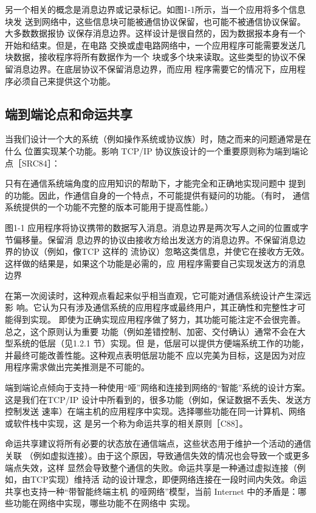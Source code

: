 另一个相关的概念是消息边界或记录标记。如图1-1所示，当一个应用将多个信息块发
送到网络中，这些信息块可能被通信协议保留，也可能不被通信协议保留。大多数数据报协
议保存消息边界。这样设计是很自然的，因为数据报本身有一个开始和结束。但是，在电路
交换或虚电路网络中，一个应用程序可能需要发送几块数据，接收程序将所有数据作为一个
块或多个块来读取。这些类型的协议不保留消息边界。在底层协议不保留消息边界，而应用
程序需要它的情况下，应用程序必须自己来提供这个功能。

\subsection{端到端论点和命运共享}
当我们设计一个大的系统（例如操作系统或协议族）时，随之而来的问题通常是在什么
位置实现某个功能。影响 TCP/IP 协议族设计的一个重要原则称为端到端论点［SRC84］：

只有在通信系统端角度的应用知识的帮助下，才能完全和正确地实现问题中
提到的功能。因此，作通信自身的一个特点，不可能提供有疑问的功能。（有时，
通信系统提供的一个功能不完整的版本可能用于提高性能。）

图1-1 应用程序将协议携带的数据写入消息。消息边界是两次写人之间的位置或字节偏移量。保留消
息边界的协议由接收方给出发送方的消息边界。不保留消息边界的协议（例如，像TCP 这样的
流协议）忽略这类信息，并使它在接收方无效。这样做的结果是，如果这个功能是必需的，应
用程序需要自己实现发送方的消息边界

在第一次阅读时，这种观点看起来似乎相当直观，它可能对通信系统设计产生深远影
响。它认为只有涉及通信系统的应用程序或最终用户，其正确性和完整性才可能得到实现。
即使为正确实现应用程序做了努力，其功能可能注定不会很完善。总之，这个原则认为重要
功能（例如差错控制、加密、交付确认）通常不会在大型系统的低层（见1.2.1 节）实现。但
是，低层可以提供方便端系统工作的功能，并最终可能改善性能。这种观点表明低层功能不
应以完美为目标，这是因为对应用程序需求做出完美推测是不可能的。

端到端论点倾向于支持一种使用“哑”网络和连接到网络的“智能”系统的设计方案。
这是我们在TCP/IP 设计中所看到的，很多功能（例如，保证数据不丢失、发送方控制发送
速率）在端主机的应用程序中实现。选择哪些功能在同一计算机、网络或软件栈中实现，这
是另一个称为命运共享的相关原则［C88］。

命运共享建议将所有必要的状态放在通信端点，这些状态用于维护一个活动的通信关联
（例如虚拟连接）。由于这个原因，导致通信失效的情况也会导致一个或更多端点失效，这样
显然会导致整个通信的失败。命运共享是一种通过虚拟连接（例如，由TCP实现）维持活
动的设计理念，即便网络连接在一段时间内失效。命运共享也支持一种“带智能终端主机
的哑网络”模型，当前 Internet 中的矛盾是：哪些功能在网络中实现，哪些功能不在网络中
实现。

